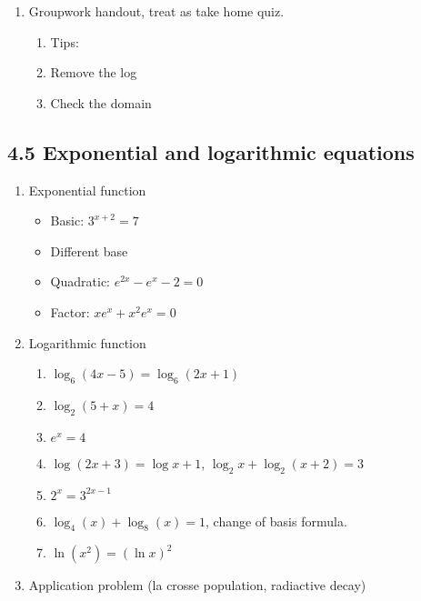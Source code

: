 \documentclass{article}
\begin{document}
\begin{enumerate}
\begin{enumerate}
\item Groupwork handout, treat as take home quiz.
\begin{enumerate}
\item Tips: 
\item Remove the log
\item Check the domain
\end{enumerate}
\end{enumerate}
\end{enumerate}

\subsection{4.5 Exponential and logarithmic equations}

\begin{enumerate}
\item Exponential function
\begin{itemize}
\item Basic: $3^{x+2} = 7$
\item Different base
\item Quadratic: $e^{2x}-e^x-2 = 0$
\item Factor: $xe^x +x^2e^x=0$
\end{itemize}
\item Logarithmic function 
\begin{enumerate}
\item  $\log_6 (4x-5) = \log_6 (2x+1)$
\item $\log_2(5+x)   = 4$
\item $e^x = 4$
\item $\log(2x+3) = \log x+1$, $\log_2 x+\log_2 (x+2) = 3$
\item $2^x = 3^{2x-1}$
\item $\log_4(x) + \log_8(x) = 1$, change of basis formula. 
\item $\ln (x^2) = (\ln x)^2$
\end{enumerate}
\item Application problem (la crosse population, radiactive decay)
\end{enumerate}
\end{document}
